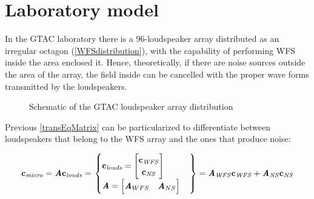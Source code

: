 \section{Laboratory model} \label{labModelSection}
In the GTAC laboratory there is a 96-loudspeaker array distributed as an irregular octagon (\autoref{WFSdistribution}), with the capability of performing WFS inside the area enclosed it. Hence, theoretically, if there are noise sources outside the area of the array, the field inside can be cancelled with the proper wave forms transmitted by the loudspeakers.

\begin{figure}
	\centering
	\caption[WFS array distribution]{Schematic of the GTAC loudspeaker array distribution}
	\label{WFSdistribution}
\end{figure}

Previous \autoref{transEqMatrix} can be particularized to differentiate between loudspeakers that belong to the WFS array and the ones that produce noise:

\begin{equation}
	\mathbf{c_\mathit{micro}} = \bm{\mathit{A}} \mathbf{c_\mathit{louds}} =
	\left. \begin{cases}
	\mathbf{c_\mathit{louds}} = 
	\begin{bmatrix}
		\mathbf{c_\mathit{WFS}} \\
		\mathbf{c_\mathit{NS}}
	\end{bmatrix} \\
	\bm{\mathit{A}} =
	\begin{bmatrix}
		\bm{\mathit{A}}_{WFS} & \bm{\mathit{A}}_{NS}
	\end{bmatrix}
	\end{cases} \right\} =
	\bm{\mathit{A}}_{\mathit{WFS}} \mathbf{c}_{\mathit{WFS}} + \bm{\mathit{A}}_{\mathit{NS}} \mathbf{c}_{\mathit{NS}}
	\label{transEqMatrixRep1}
\end{equation}

